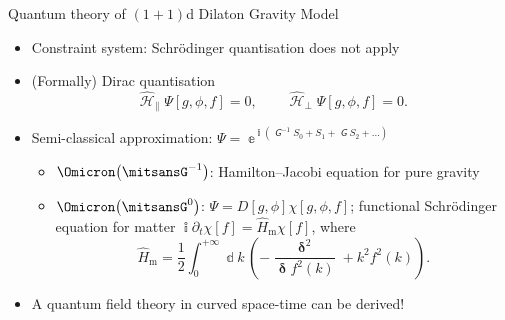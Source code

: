\documentclass{beamer}
\newcommand{\ii}{{\Bbbi}}
\newcommand{\ee}{{\Bbbe}}
\newcommand{\rbr}[1]{{\left(#1\right)}}
\newcommand{\rfun}[2]{{#1}\mathopen{}\left(#2\right)\mathclose{}}
\newcommand{\sfun}[2]{{#1}\mathopen{}\left[#2\right]\mathclose{}}
\newcommand{\dd}{\Bbbd}
\newcommand{\what}[1]{{\widehat{#1}}}
\newcommand{\nG}{\mitsansG} %
\begin{document}
\begin{frame}[allowframebreaks]{Quantum theory of $\rbr{1+1}$d Dilaton Gravity 
Model}{\cite{Demers1996}}

\begin{itemize}
\item Constraint system: Schrödinger quantisation does not apply
\item (Formally) Dirac quantisation
\begin{equation}
 \what{\mscrH}_\parallel \sfun{\Psi}{g,\phi,f} = 0, \qquad
 \what{\mscrH}_\perp  \sfun{\Psi}{g,\phi,f} = 0.
\end{equation}




\item Semi-classical approximation: $\Psi = \ee^{\ii\rbr{\nG^{-1}S_0 + 
S_1 + \nG S_2 + \ldots}}$

\begin{itemize}
\item $\rfun{\Omicron}{\nG^{-1}}$: Hamilton--Jacobi equation for pure gravity
\item $\rfun{\Omicron}{\nG^0}$: $\Psi = \sfun{D}{g, \phi}
\sfun{\chi}{g, \phi, f}$; functional \alert{Schrödinger equation for matter}
$\ii \partial_t\sfun{\chi}{f} = \what{H}_\text{m} \sfun{\chi}{f}$, where
\begin{equation}
\what{H}_\text{m} = \frac{1}{2}\int_{0}^{+\infty} \dd k\,
\rbr{-\frac{\mbfdelta^2}{\mbfdelta \rfun{f^2}{k}} + k^2 \rfun{f^2}{k}}.
\end{equation}
\end{itemize}
\item A quantum field theory in curved space-time can be \alert{derived}!


\end{itemize}
\end{frame}
\end{document}
